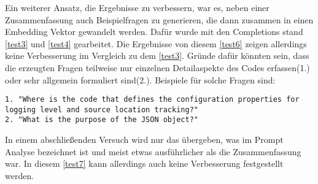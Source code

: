 \documentclass[../main.tex]{subfiles}
\begin{document}
Ein weiterer Ansatz, die Ergebnisse zu verbessern, war es, neben einer Zusammenfassung auch Beispielfragen zu generieren, die dann zusammen in einen Embedding Vektor gewandelt werden.
Dafür wurde mit den Completions stand \ref{test3} und \ref{test4} gearbeitet.
Die Ergebnisse von diesem \ref{test6} zeigen allerdings keine Verbesserung im Vergleich zu dem \ref{test3}.
Gründe dafür könnten sein, dass die erzeugten Fragen teilweise nur einzelnen Detailaspekte des Codes erfassen(1.) oder sehr allgemein formuliert sind(2.).
Beispiele für solche Fragen sind:
\begin{center}
\begin{lstlisting}
1. "Where is the code that defines the configuration properties for logging level and source location tracking?"
2. "What is the purpose of the JSON object?"
\end{lstlisting}
\end{center}

In einem abschließenden Versuch wird nur das übergeben, was im Prompt Analyse bezeichnet ist und meist etwas ausführlicher als die Zusammenfassung war. 
In diesem \ref{test7} kann allerdings auch keine Verbesserung festgestellt werden.
\end{document}
